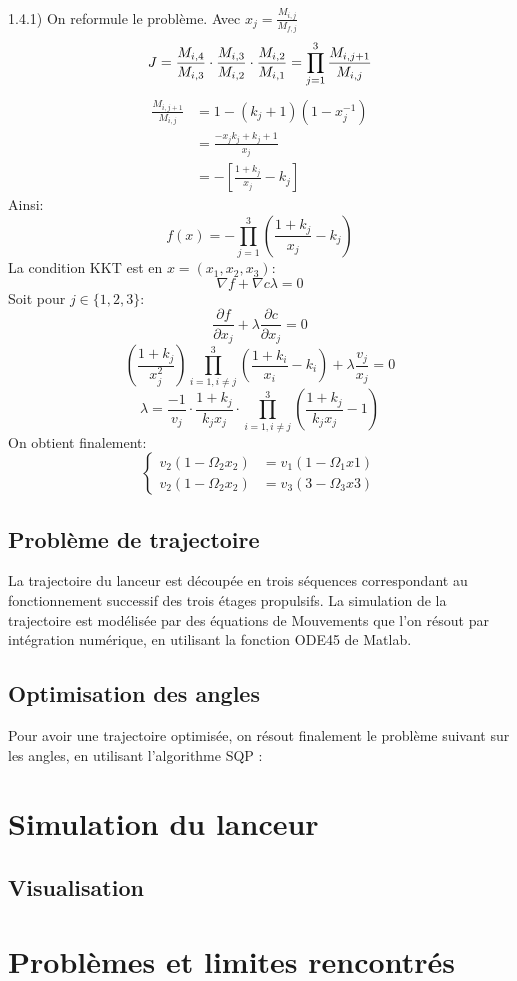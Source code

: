 \documentclass[a4paper,20pt]{article}
\begin{document}
1.4.1) On reformule le probl\`eme. Avec $x_j=\frac{M_{i,j}}{M_{f,j}}$
$$
J=\frac{M_{i,4}}{M_{i,3}}\cdot\frac{M_{i,3}}{M_{i,2}}
\cdot\frac{M_{i,2}}{M_{i,1}}=\prod\limits_{j=1}^3\frac{M_{i,j+1}}{M_{i,j}} \\
$$
\begin{equation*}
\begin{split}
\frac{M_{i,j+1}}{M_{i,j}}&=1-(k_j+1)(1-x_j^{-1}) \\
&=\frac{-x_jk_j+k_j+1}{x_j} \\
&=-\left[\frac{1+k_j}{x_j}-k_j\right]
\end{split}
\end{equation*}
Ainsi:
$$
f(x)=-\prod\limits_{j=1}^3\left(\frac{1+k_j}{x_j}-k_j\right)
$$
La condition KKT est en $x=(x_1, x_2, x_3)$:
$$
\nabla f+\nabla c\lambda=0
$$
Soit pour $j\in\{1, 2, 3\}$:
$$
\frac{\partial f}{\partial x_j}+\lambda\frac{\partial c}{\partial x_j}=0
$$
$$
\left(\frac{1+k_j}{x_j^2}\right)\prod\limits_{i=1, i\neq j}^3
\left(\frac{1+k_i}{x_i}-k_i\right)+\lambda\frac{v_j}{x_j}=0
$$
$$
\lambda=\frac{-1}{v_j}\cdot\frac{1+k_j}{k_jx_j}
\cdot\prod\limits_{i=1, i\neq j}^3\left(\frac{1+k_j}{k_jx_j}-1\right)
$$
On obtient finalement:
$$
\begin{cases}
v_2(1-\Omega_2x_2)&=v_1(1-\Omega_1x1) \\
v_2(1-\Omega_2x_2)&=v_3(3-\Omega_3x3)
\end{cases}
$$
\subsection{Probl\`eme de trajectoire}
La trajectoire du lanceur est d\'ecoup\'ee en trois s\'equences correspondant au
 fonctionnement successif des trois \'etages propulsifs. La simulation de la
 trajectoire est mod\'elis\'ee par des \'equations de Mouvements que l'on
 r\'esout par int\'egration num\'erique, en utilisant la fonction ODE45 de
 Matlab.

\subsection{Optimisation des angles}
Pour avoir une trajectoire optimis\'ee, on r\'esout finalement le probl\`eme
 suivant sur les angles, en utilisant l'algorithme SQP :

\section{Simulation du lanceur}
\subsection{Visualisation}
\section{Probl\`emes et limites rencontr\'es}
\end{document}
